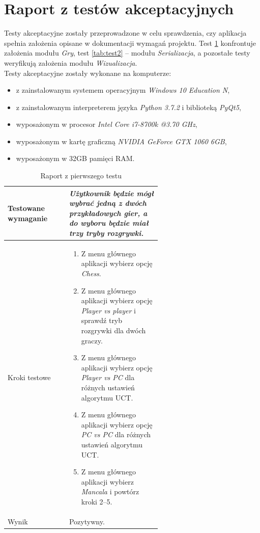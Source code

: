 \documentclass{article}
\let\oldsection\section
\renewcommand\section{\clearpage\oldsection}
\newcommand{\modulename}[1]{\textit{#1}}
\begin{document}
\section{Raport z testów akceptacyjnych}
Testy akceptacyjne zostały przeprowadzone w celu sprawdzenia, czy aplikacja spełnia założenia opisane w dokumentacji wymagań projektu. Test \ref{tab:test1} konfrontuje założenia modułu \modulename{Gry}, test \ref{tab:test2} – modułu \modulename{Serializacja}, a pozostałe testy weryfikują założenia modułu \modulename{Wizualizacja}. \\

\noindent Testy akceptacyjne zostały wykonane na komputerze:
\begin{itemize}
	\item z zainstalowanym systemem operacyjnym \modulename{Windows 10 Education N},
	\item z zainstalowanym interpreterem języka \modulename{Python 3.7.2} i biblioteką \modulename{PyQt5},
	\item wyposażonym w procesor \modulename{Intel Core i7-8700k @3.70 GHz},
	\item wyposażonym w kartę graficzną \modulename{NVIDIA GeForce GTX 1060 6GB},
	\item wyposażonym w 32GB pamięci RAM.
\end{itemize}

\begin{table}[h!]
\centering
\begin{tabular}{|l|p{0.6\linewidth}|}
	\hline
	Testowane wymaganie & \modulename{Użytkownik będzie mógł wybrać jedną z dwóch przykładowych gier, a do wyboru będzie miał trzy tryby rozgrywki.} \\ \hline
	Kroki testowe & \begin{enumerate} \item Z menu głównego aplikacji wybierz opcję \modulename{Chess}. \item Z menu głównego aplikacji wybierz opcję \modulename{Player vs player} i sprawdź tryb rozgrywki dla dwóch graczy. \item Z menu głównego aplikacji wybierz opcję \modulename{Player vs PC} dla różnych ustawień algorytmu UCT. \item Z menu głównego aplikacji wybierz opcję \modulename{PC vs PC} dla różnych ustawień algorytmu UCT. \item Z menu głównego aplikacji wybierz \modulename{Mancala} i powtórz kroki 2–5. \end{enumerate} \\ \hline
	Wynik & Pozytywny. \\ \hline
\end{tabular}
\caption{Raport z pierwszego testu}
\label{tab:test1}
\end{table}
\end{document}
